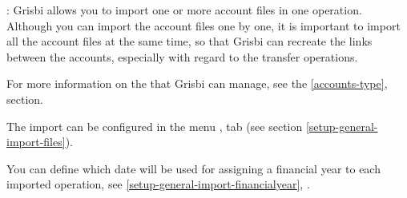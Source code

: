 \Note{}: Grisbi allows you to import one or more account files in one operation. Although you can import the account files one by one, it is important to import all the account files at the same time, so that Grisbi can recreate the links between the accounts, especially with regard to the transfer operations.

For more information on the  that Grisbi can manage, see the \vref{accounts-type},  section.

The import can be configured in the menu ,  tab (see section \vref{setup-general-import-files}).

You can define which date will be used for assigning a financial year to each imported operation, see \vref{setup-general-import-financialyear}, .


